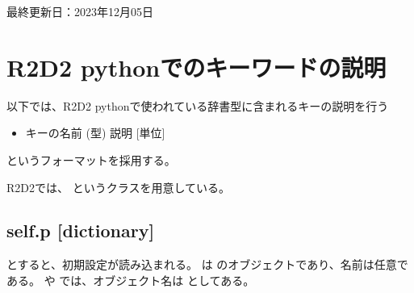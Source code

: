 \documentclass[letterpaper,10pt,dvipdfmx,report]{sphinxmanual}
\begin{document}
\sphinxAtStartPar
最終更新日：2023年12月05日

\sphinxstepscope


\chapter{R2D2 pythonでのキーワードの説明}
\label{\detokenize{notation:r2d2-python}}\label{\detokenize{notation::doc}}
\sphinxAtStartPar
以下では、R2D2 pythonで使われている辞書型に含まれるキーの説明を行う
\begin{itemize}
\item {} 
\sphinxAtStartPar
キーの名前 (型) \sphinxhyphen{}\sphinxhyphen{} 説明 {[}単位{]}

\end{itemize}

\sphinxAtStartPar
というフォーマットを採用する。

\sphinxAtStartPar
R2D2では、 というクラスを用意している。


\section{self.p {[}dictionary{]}}
\label{\detokenize{notation:self-p-dictionary}}
\begin{sphinxVerbatim}[commandchars=\\\{\}]
 
  
\end{sphinxVerbatim}

\sphinxAtStartPar
とすると、初期設定が読み込まれる。  は  のオブジェクトであり、名前は任意である。  や  では、オブジェクト名は  としてある。
\end{document}
